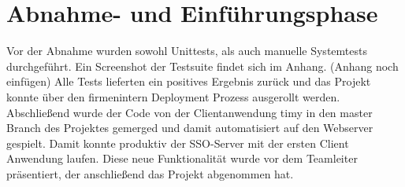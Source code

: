 \section{Abnahme- und Einführungsphase} 
\label{sec:AbnahmeEinfuehrung}

Vor der Abnahme wurden sowohl Unittests, als auch manuelle Systemtests durchgeführt. Ein Screenshot der Testsuite findet sich im Anhang. (Anhang noch einfügen)
Alle Tests  lieferten ein positives Ergebnis zurück und das Projekt konnte über den firmenintern Deployment Prozess ausgerollt werden.
Abschließend wurde der Code von der Clientanwendung timy in den master Branch des Projektes gemerged und damit automatisiert auf den Webserver gespielt.
Damit konnte produktiv der SSO-Server mit der ersten Client Anwendung laufen. 
Diese neue Funktionalität wurde vor dem Teamleiter präsentiert, der anschließend das Projekt abgenommen hat.
